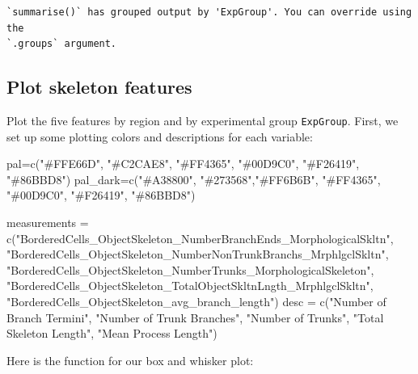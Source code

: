\documentclass[
  12pt,
  letterpaper,
  DIV=11,
  numbers=noendperiod]{scrartcl}
\newenvironment{Shaded}{\begin{snugshade}}{\end{snugshade}}
\newcommand{\FunctionTok}[1]{\textcolor[rgb]{0.28,0.35,0.67}{#1}}
\newcommand{\NormalTok}[1]{\textcolor[rgb]{0.00,0.23,0.31}{#1}}
\newcommand{\OtherTok}[1]{\textcolor[rgb]{0.00,0.23,0.31}{#1}}
\newcommand{\StringTok}[1]{\textcolor[rgb]{0.13,0.47,0.30}{#1}}
\begin{document}
\begin{verbatim}
`summarise()` has grouped output by 'ExpGroup'. You can override using the
`.groups` argument.
\end{verbatim}

\hypertarget{plot-skeleton-features}{%
\subsection{Plot skeleton features}\label{plot-skeleton-features}}

Plot the five features by region and by experimental group
\texttt{ExpGroup}. First, we set up some plotting colors and
descriptions for each variable:

\begin{Shaded}
\begin{Highlighting}[]
\NormalTok{pal}\OtherTok{=}\FunctionTok{c}\NormalTok{(}\StringTok{"\#FFE66D"}\NormalTok{,  }\StringTok{"\#C2CAE8"}\NormalTok{, }\StringTok{"\#FF4365"}\NormalTok{, }\StringTok{"\#00D9C0"}\NormalTok{, }\StringTok{"\#F26419"}\NormalTok{, }\StringTok{"\#86BBD8"}\NormalTok{)}
\NormalTok{pal\_dark}\OtherTok{=}\FunctionTok{c}\NormalTok{(}\StringTok{"\#A38800"}\NormalTok{,  }\StringTok{"\#273568"}\NormalTok{,}\StringTok{"\#FF6B6B"}\NormalTok{, }\StringTok{"\#FF4365"}\NormalTok{, }\StringTok{"\#00D9C0"}\NormalTok{, }\StringTok{"\#F26419"}\NormalTok{, }\StringTok{"\#86BBD8"}\NormalTok{)}

\NormalTok{measurements }\OtherTok{=} \FunctionTok{c}\NormalTok{(}\StringTok{"BorderedCells\_ObjectSkeleton\_NumberBranchEnds\_MorphologicalSkltn"}\NormalTok{, }
                 \StringTok{"BorderedCells\_ObjectSkeleton\_NumberNonTrunkBranchs\_MrphlgclSkltn"}\NormalTok{,}
                 \StringTok{"BorderedCells\_ObjectSkeleton\_NumberTrunks\_MorphologicalSkeleton"}\NormalTok{,}
                 \StringTok{"BorderedCells\_ObjectSkeleton\_TotalObjectSkltnLngth\_MrphlgclSkltn"}\NormalTok{,}
                 \StringTok{"BorderedCells\_ObjectSkeleton\_avg\_branch\_length"}\NormalTok{)}
\NormalTok{desc }\OtherTok{=} \FunctionTok{c}\NormalTok{(}\StringTok{"Number of Branch Termini"}\NormalTok{,}
         \StringTok{"Number of Trunk Branches"}\NormalTok{,}
         \StringTok{"Number of Trunks"}\NormalTok{,}
         \StringTok{"Total Skeleton Length"}\NormalTok{,}
         \StringTok{"Mean Process Length"}\NormalTok{)}
\end{Highlighting}
\end{Shaded}

Here is the function for our box and whisker plot:
\end{document}
